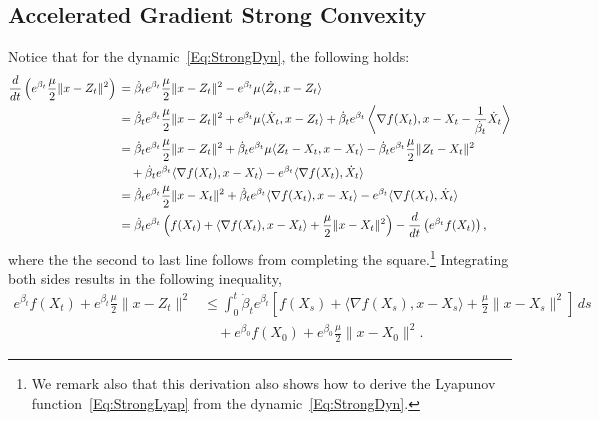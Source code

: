 \documentclass[11pt]{article}
\theoremstyle{plain}
\begin{document}
\subsection{Accelerated Gradient Strong Convexity}
Notice that for the dynamic~\eqref{Eq:StrongDyn}, the following holds:
\begin{align}\label{Eq:Strong}
 \frac{d}{dt}\left(e^{\beta_t}\frac{\mu}{2} \|x - Z_t\|^2\right)\, &=  \dot \beta_t e^{\beta_t} \frac{\mu}{2} \|x - Z_t\|^2 - e^{\beta_t} \mu\langle \dot Z_t, x - Z_t\rangle \notag\\
 &=  \dot \beta_t e^{\beta_t} \frac{\mu}{2} \|x - Z_t\|^2 + e^{\beta_t} \mu\langle \dot X_t, x - Z_t\rangle  + \dot  \beta_t e^{\beta_t} \left\langle \nabla f(X_t), x - X_t - \frac{1}{\dot \beta_t} \dot X_t\right\rangle \notag \\
  &=\dot  \beta_t e^{\beta_t} \frac{\mu}{2} \|x - Z_t\|^2 + \dot \beta_te^{\beta_t} \mu\langle  Z_t - X_t, x - X_t \rangle - \dot \beta_te^{\beta_t} \frac{\mu}{2}\| Z_t - X_t\|^2 \notag\\
 &\quad + \dot \beta_t e^{\beta_t} \langle \nabla f(X_t), x - X_t \rangle  - e^{\beta_t} \langle \nabla f(X_t),\dot X_t\rangle \notag\\
 & =  \dot \beta_t e^{\beta_t} \frac{\mu}{2} \|x - X_t\|^2 + \dot \beta_t e^{\beta_t} \langle \nabla f(X_t), x - X_t \rangle   - e^{\beta_t} \langle \nabla f(X_t),\dot X_t\rangle \notag \\
 &=   \dot \beta_t e^{\beta_t}\left( f(X_t) + \langle \nabla f(X_t), x - X_t \rangle+ \frac{\mu}{2} \|x - X_t\|^2\right)   -  \frac{d}{dt}\left( e^{ \beta_t}  f(X_t)\right),
\end{align}
where the the second to last line follows from completing the square.\footnote{We remark also that this derivation also shows how to derive the Lyapunov function~\eqref{Eq:StrongLyap} from the dynamic~\eqref{Eq:StrongDyn}.} %
 Integrating both sides results in the following inequality, 
\begin{align*}
e^{\beta_t} f(X_t) + e^{\beta_t}\frac{\mu}{2} \|x - Z_t\|^2 &\leq \int_0^t\dot \beta_t e^{\beta_t}[ f(X_s)+ \langle \nabla f(X_s), x - X_s \rangle+ \frac{\mu}{2} \|x - X_s\|^2]\, ds\\
& \quad+ e^{\beta_0}f(X_0) + e^{\beta_0}\frac{\mu}{2} \|x - X_0\|^2.
\end{align*}
\end{document}
